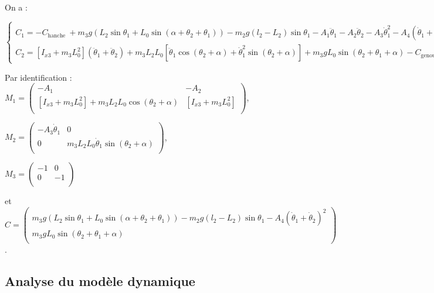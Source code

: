 \documentclass[11pt]{article}
\begin{document}
\begin{UPSTIcorrige}
On a :

$\left\{
\begin{array}{l}
C_{1} = - C_{\textrm {hanche }}+ m_3 g\left(  L_2 \sin \theta_1 +  L_0 \sin\left( \alpha + \theta_2 + \theta_1\right)\right)  - m_2 g\left( l_2 - L_2\right) \sin \theta_1 - A_{1} \ddot{\theta}_{1}-A_{2} \ddot{\theta}_{2}-A_{3} \dot{\theta}_{1}^{2}-A_{4}\left(\dot{\theta}_{1}+\dot{\theta}_{2}\right)^{2} \\
C_{2}=\left[I_{x 3}+m_{3} L_{0}^{2}\right]\left(\ddot{\theta}_{1}+\ddot{\theta}_{2}\right)+m_{3} L_{2} L_{0}\left[\ddot{\theta}_{1} \cos \left(\theta_{2}+\alpha\right)+\dot{\theta}_{1}^{2} \sin \left(\theta_{2}+\alpha\right)\right]+m_{3} g L_{0} \sin \left(\theta_{2}+\theta_{1}+\alpha\right)-C_{\text {genou }}
\end{array}\right.
$

Par identification : 
$M_1 = \begin{pmatrix}
-A_1 & - A_2 \\
\left[I_{x 3}+m_{3} L_{0}^{2}\right]  +m_{3} L_{2} L_{0}\cos \left(\theta_{2}+\alpha\right) & \left[I_{x 3}+m_{3} L_{0}^{2}\right] \\
\end{pmatrix}$,

$M_2 = \begin{pmatrix}
-A_{3} \dot{\theta}_{1}  & 0 \\
0 & m_{3} L_{2} L_{0} \dot{\theta}_{1} \sin \left(\theta_{2}+\alpha\right) \\
\end{pmatrix}$, 

$M_3 = \begin{pmatrix}
- 1 & 0 \\
0 & - 1  \\
\end{pmatrix}$

et 
$C = \begin{pmatrix}
 m_3 g\left(  L_2 \sin \theta_1 +  L_0 \sin\left( \alpha + \theta_2 + \theta_1\right)\right) - m_2 g\left( l_2 - L_2\right) \sin \theta_1 -A_{4}\left(\dot{\theta}_{1}+\dot{\theta}_{2}\right)^{2}\\
m_{3} g L_{0} \sin \left(\theta_{2}+\theta_{1}+\alpha\right) \\
\end{pmatrix}$.

\end{UPSTIcorrige}


\subsection{Analyse du modèle dynamique}
\end{document}
